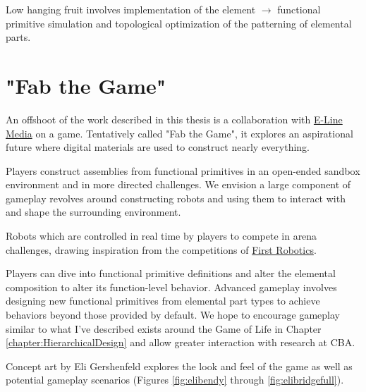 {Low hanging fruit involves implementation of the element $\rightarrow$ functional primitive simulation and topological optimization of the patterning of elemental parts.


\section{"Fab the Game"}

An offshoot of the work described in this thesis is a collaboration with \href{http://elinemedia.com/}{E-Line Media} on a game.  Tentatively called "Fab the Game", it explores an aspirational future where digital materials are used to construct nearly everything.  

Players construct assemblies from functional primitives in an open-ended sandbox environment and in more directed challenges.  We envision a large component of gameplay revolves around constructing robots and using them to interact with and shape the surrounding environment.


Robots which are controlled in real time by players to compete in arena challenges, drawing inspiration from the competitions of \href{http://www.firstinspires.org/robotics/frc}{First Robotics}.


Players can dive into functional primitive definitions and alter the elemental composition to alter its function-level behavior.  Advanced gameplay involves designing new functional primitives from elemental part types to achieve behaviors beyond those provided by default.  We hope to encourage gameplay similar to what I've described exists around the Game of Life in Chapter \ref{chapter:HierarchicalDesign} and allow greater interaction with research at CBA.

Concept art by Eli Gershenfeld explores the look and feel of the game as well as potential gameplay scenarios (Figures \ref{fig:elibendy} through \ref{fig:elibridgefull}).

}

